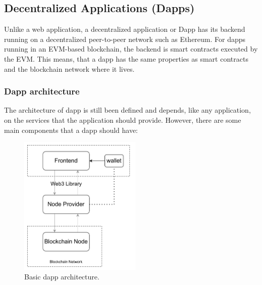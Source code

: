 \documentclass[11pt,a4paper]{report}
\begin{document}
\subsection{Decentralized Applications (Dapps)}\label{sec:dapps}
Unlike a web application, a decentralized application or Dapp\cite{book:dapps}\cite{dapps}\cite{dapps_arch} has its backend running on a decentralized peer-to-peer network such as Ethereum. For dapps running in an EVM-based blockchain, the backend is smart contracts executed by the EVM. This means, that a dapp has the same properties as smart contracts and the blockchain network where it lives.
\subsubsection{Dapp architecture}\label{dapp}
The architecture of dapp is still been defined and depends, like any application, on the services that the application should provide. However, there are some main components that a dapp should have: 
\begin{figure}[htp]
	\centering
	\includegraphics[width=0.52\textwidth]{./images/dappcomponents1}
	\caption{Basic dapp architecture.}
	\label{fig:dappcomponents}
\end{figure}
\end{document}
